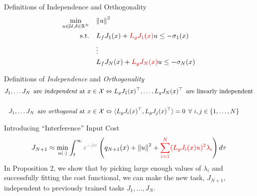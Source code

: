 \begin{frame}{Definitions of Independence and Orthogonality}
	\begin{align*}
		\min_{u \in \mathcal{U}, \delta \in \mathbb{R}^N} \quad & { \lVert u \rVert }^2 \\
		\textrm{s.t.} \quad & L_f {J}_1 (x) + { \color{red} L_g {J}_1 (x) } u \le - \sigma_1(x) \\
                \quad & \vdots \\
		\quad & L_f {J}_N (x) + { \color{red} L_g {J}_N (x) } u \le - \sigma_N(x) \\
	\end{align*}
\end{frame}

\begin{frame}{Definitions of \textit{Independence} and \textit{Orthogonality}}
	\centering
	\begin{align*}
		{J}_1, \ldots {J}_N \,\,\, \textrm{are \textit{independent} at $x \in \mathcal{X}$} &\Leftrightarrow L_g {J}_1 (x)^{\top}, \ldots, L_g {J}_N (x)^{\top} \,\,\, \textrm{are linearly independent}\\
		\\
		{J}_1, \ldots {J}_N \,\,\, \textrm{are \textit{orthogonal} at $x \in \mathcal{X}$} &\Leftrightarrow \langle L_g {J}_i (x)^{\top}, L_g {J}_j (x)^{\top} \rangle = 0 \,\,\, \forall \,\, i, j \in \{1,\ldots,N \}
	\end{align*}
\end{frame}

\begin{frame}{Introducing ``Interference'' Input Cost}
	\begin{align*}
		{J}_{N + 1} \approx \min_{u(\cdot)} \int_t^{\infty} { \color{gray}  e^{- \beta \tau } } \left( q_{N + 1}(x) + { \lVert u \rVert }^2 + { \color{red} \sum_{i = 1}^N ( L_g {J}_i (x) u)^2 \lambda_i } \right) d \tau
        \end{align*}
	\seprule
	In Proposition 2, we show that by picking large enough values of $\lambda_i$ and successfully fitting the cost functional, we can make the new task, $J_{N + 1}$, independent to previously trained tasks $J_1, \ldots, J_N$. 
\end{frame}

